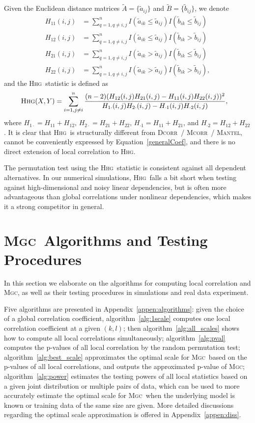 \documentclass[11pt]{article}
\providecommand{\sct}[1]{{\normalfont\textsc{#1}}}
\newcommand{\Mgc}{\sct{Mgc}}
\newcommand{\Hhg}{\sct{Hhg}}
\newcommand{\Dcorr}{\sct{Dcorr}}
\newcommand{\Mcorr}{\sct{Mcorr}}
\newcommand{\Mantel}{\sct{Mantel}}
\begin{document}
Given the Euclidean distance matrices $\tilde{A}=\{\tilde{a}_{ij}\}$ and $\tilde{B}=\{\tilde{b}_{ij}\}$, we denote
\begin{align*}
H_{11}(i,j) &= \sum_{q=1,q\neq i,j}^{n}I(\tilde{a}_{ik} \leq \tilde{a}_{ij})I(\tilde{b}_{ik} \leq \tilde{b}_{ij}) \\
H_{12}(i,j) &= \sum_{q=1,q\neq i,j}^{n}I(\tilde{a}_{ik} \leq \tilde{a}_{ij})I(\tilde{b}_{ik} > \tilde{b}_{ij}) \\
H_{21}(i,j) &= \sum_{q=1,q\neq i,j}^{n}I(\tilde{a}_{ik} > \tilde{a}_{ij})I(\tilde{b}_{ik} \leq \tilde{b}_{ij}) \\
H_{22}(i,j) &= \sum_{q=1,q\neq i,j}^{n}I(\tilde{a}_{ik} > \tilde{a}_{ij})I(\tilde{b}_{ik} > \tilde{b}_{ij}),
\end{align*}
and the \Hhg~statistic is defined as
\begin{align*}
\Hhg(X,Y) &= \sum_{i=1,j\neq i}^{n} \frac{(n-2)(H_{12}(i,j)H_{21}(i,j)-H_{11}(i,j)H_{22}(i,j))^2}{H_{1 \cdot}(i,j)H_{2 \cdot}(i,j)-H_{\cdot 1}(i,j)H_{\cdot 2}(i,j)},
\end{align*}
where $H_{1 \cdot}=H_{11}+H_{12}$, $H_{2 \cdot}=H_{21}+H_{22}$, $H_{\cdot 1}=H_{11}+H_{21}$, and $H_{\cdot 2}=H_{12}+H_{22}$. It is clear that \Hhg~is structurally different from \Dcorr~/ \Mcorr~/ \Mantel, cannot be conveniently expressed by Equation~\ref{generalCoef}, and there is no direct extension of local correlation to \Hhg.

The permutation test using the \Hhg~statistic is consistent against all dependent alternatives. In our numerical simulations, \Hhg~falls a bit short when testing against high-dimensional and noisy linear dependencies, but is often more advantageous than global correlations under nonlinear dependencies, which makes it a strong competitor in general.

\section{\Mgc~Algorithms and Testing Procedures}
\label{appen:tests}
In this section we elaborate on the algorithms for computing local correlation and \Mgc, as well as their testing procedures in simulations and real data experiment.

Five algorithms are presented in Appendix~\ref{appen:algorithms}: given the choice of a global correlation coefficient, algorithm~\ref{alg:1scale} computes one local correlation coefficient at a given $(k,l)$; then algorithm~\ref{alg:all_scales} shows how to compute all local correlations simultaneously; algorithm~\ref{alg:pval} computes the p-values of all local correlation by the random permutation test; algorithm~\ref{alg:best_scale} approximates the optimal scale for \Mgc~based on the p-values of all local correlations, and outputs the approximated p-value of \Mgc; algorithm~\ref{alg:power} estimates the testing powers of all local statistics based on a given joint distribution or multiple pairs of data, which can be used to more accurately estimate the optimal scale for \Mgc~when the underlying model is known or training data of the same size are given. More detailed discussions regarding the optimal scale approximation is offered in Appendix~\ref{appen:diss}.
\end{document}
